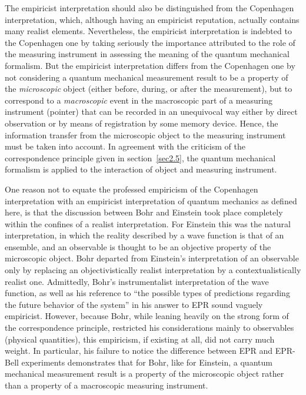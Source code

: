 \documentclass[12pt]{article}
\begin{document}
The empiricist interpretation should also be distinguished from
the Copenhagen interpretation, which, although having an
empiricist reputation, actually contains many realist elements.
Nevertheless, the empiricist interpretation is indebted to the
Copenhagen one by taking seriously the importance attributed to
the role of the measuring instrument in assessing the meaning of
the quantum mechanical formalism. But the empiricist
interpretation differs from the Copenhagen one by not
considering a quantum mechanical measurement result to be a
property of the {\em microscopic} object (either before, during, or
after the measurement), but to correspond to a {\em macroscopic}
event in the macroscopic part of a measuring instrument (pointer)
that can be recorded in an unequivocal way either by direct
observation or by means of registration by some memory device.
Hence, the information transfer from the microscopic object to the
measuring instrument must be taken into account. In agreement with
the criticism of the correspondence principle given in
section~\ref{sec2.5}, the quantum mechanical formalism is applied
to the interaction of object and measuring instrument.

One reason not to equate the professed empiricism of the
Copenhagen interpretation with an empiricist interpretation of
quantum mechanics as defined here, is that the discussion between
Bohr and Einstein took place completely within the confines of a
realist interpretation. For Einstein this was the natural
interpretation, in which the reality described by a wave function
is that of an ensemble, and an observable is thought to be an
objective property of the microscopic object. Bohr departed from
Einstein's interpretation of an observable only by replacing an
objectivistically realist interpretation by a contextualistically
realist one. Admittedly, Bohr's instrumentalist interpretation of
the wave function, as well as his reference to ``the possible
types of predictions regarding the future behavior of the system''
in his answer \cite{Bohr35} to EPR sound vaguely empiricist.
However, because Bohr, while leaning heavily on the strong form of
the correspondence principle, restricted his considerations mainly
to observables (physical quantities), this empiricism, if existing
at all, did not carry much weight. In particular, his failure to
notice the difference between EPR and EPR-Bell experiments
demonstrates that for Bohr, like for Einstein, a quantum
mechanical measurement result is a property of the microscopic
object rather than a property of a macroscopic measuring
instrument.
\end{document}
